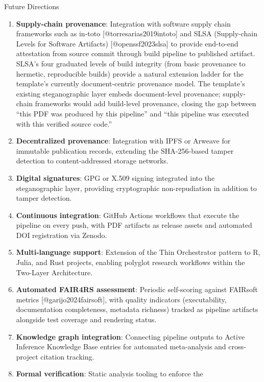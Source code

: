 \documentclass[
  ignorenonframetext,
]{beamer}
\author{\texorpdfstring{}{}}
\date{}
\providecommand{\tightlist}{%
  \setlength{\itemsep}{0pt}\setlength{\parskip}{0pt}}
\begin{document}
\begin{frame}[fragile]{Future Directions}
\protect{}\label{future-directions}
\begin{enumerate}
\tightlist
\item
  \textbf{Supply-chain provenance}: Integration with software supply
  chain frameworks such as in-toto {[}@torresarias2019intoto{]} and SLSA
  (Supply-chain Levels for Software Artifacts) {[}@openssf2023slsa{]} to
  provide end-to-end attestation from source commit through build
  pipeline to published artifact. SLSA's four graduated levels of build
  integrity (from basic provenance to hermetic, reproducible builds)
  provide a natural extension ladder for the template's currently
  document-centric provenance model. The template's existing
  steganographic layer embeds document-level provenance; supply-chain
  frameworks would add build-level provenance, closing the gap between
  ``this PDF was produced by this pipeline'' and ``this pipeline was
  executed with this verified source code.''
\item
  \textbf{Decentralized provenance}: Integration with IPFS or Arweave
  for immutable publication records, extending the SHA-256-based tamper
  detection to content-addressed storage networks.
\item
  \textbf{Digital signatures}: GPG or X.509 signing integrated into the
  steganographic layer, providing cryptographic non-repudiation in
  addition to tamper detection.
\item
  \textbf{Continuous integration}: GitHub Actions workflows that execute
  the pipeline on every push, with PDF artifacts as release assets and
  automated DOI registration via Zenodo.
\item
  \textbf{Multi-language support}: Extension of the Thin Orchestrator
  pattern to R, Julia, and Rust projects, enabling polyglot research
  workflows within the Two-Layer Architecture.
\item
  \textbf{Automated FAIR4RS assessment}: Periodic self-scoring against
  FAIRsoft metrics {[}@garijo2024fairsoft{]}, with quality indicators
  (executability, documentation completeness, metadata richness) tracked
  as pipeline artifacts alongside test coverage and rendering status.
\item
  \textbf{Knowledge graph integration}: Connecting pipeline outputs to
  Active Inference Knowledge Base entries for automated meta-analysis
  and cross-project citation tracking.
\item
  \textbf{Formal verification}: Static analysis tooling to enforce the

\end{enumerate}
\end{frame}
\end{document}
